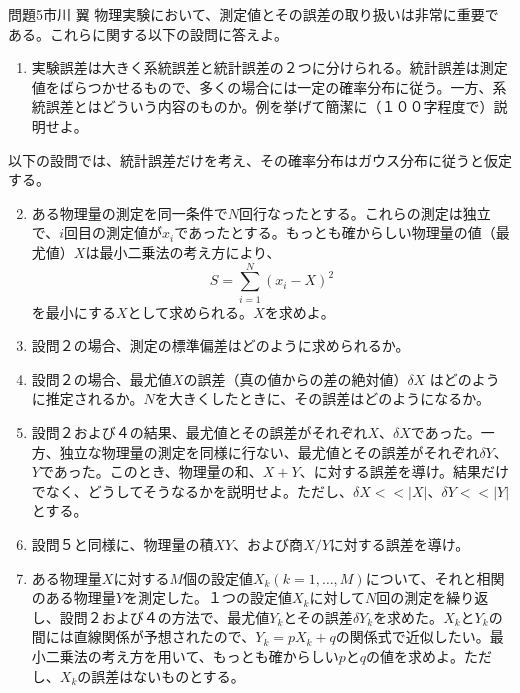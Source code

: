 \documentclass[fleqn]{jbook}
\begin{document}
\begin{question}{問題5}{市川 翼}
 物理実験において、測定値とその誤差の取り扱いは非常に重要である。これらに関する以下の設問に答えよ。

\begin{enumerate}
	\item 実験誤差は大きく系統誤差と統計誤差の２つに分けられる。統計誤差は測定値をばらつかせるもので、多くの場合には一定の確率分布に従う。一方、系統誤差とはどういう内容のものか。例を挙げて簡潔に（１００字程度で）説明せよ。
\end{enumerate}

 以下の設問では、統計誤差だけを考え、その確率分布はガウス分布に従うと仮定する。
\begin{enumerate}
\setcounter{enumi}{1}
	\item ある物理量の測定を同一条件で$N$回行なったとする。これらの測定は独立で、$i$回目の測定値が$x_i$であったとする。もっとも確からしい物理量の値（最尤値）$X$は最小二乗法の考え方により、
	\begin{equation}
	    S = \sum _{i=1} ^N (x_i - X)^2
	\end{equation}
を最小にする$X$として求められる。$X$を求めよ。
	\item 設問２の場合、測定の標準偏差はどのように求められるか。
	\item 設問２の場合、最尤値$X$の誤差（真の値からの差の絶対値）$\delta X$ はどのように推定されるか。$N$を大きくしたときに、その誤差はどのようになるか。
	\item 設問２および４の結果、最尤値とその誤差がそれぞれ$X$、$\delta X$であった。一方、独立な物理量の測定を同様に行ない、最尤値とその誤差がそれぞれ$\delta Y$、$Y$であった。このとき、物理量の和、$X + Y$、に対する誤差を導け。結果だけでなく、どうしてそうなるかを説明せよ。ただし、$\delta X <<|X|$、$\delta Y <<|Y|$とする。
	\item 設問５と同様に、物理量の積$XY$、および商$X/Y$に対する誤差を導け。
	\item ある物理量$X$に対する$M$個の設定値$X_k(k=1,\dots ,M)$について、それと相関のある物理量$Y$を測定した。１つの設定値$X_k$に対して$N$回の測定を繰り返し、設問２および４の方法で、最尤値$Y_k$とその誤差$\delta Y_k$を求めた。$X_k$と$Y_k$の間には直線関係が予想されたので、$Y_k = pX_k + q$の関係式で近似したい。最小二乗法の考え方を用いて、もっとも確からしい$p$と$q$の値を求めよ。ただし、$X_k$の誤差はないものとする。
\end{enumerate}
\end{question}
\end{document}
